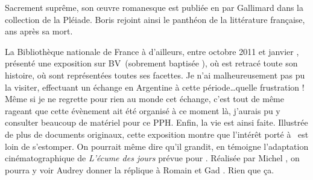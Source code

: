 Sacrement suprême, son \oe{}uvre romanesque est publiée en  par Gallimard dans la collection
de la Pléiade. Boris rejoint ainsi le panthéon de la littérature française,  ans après sa mort.

La Bibliothèque nationale de France à d'ailleurs, entre octobre 2011 et janvier , présenté
une exposition sur BV\ (sobrement baptisée \emph{\BV}), où est retracé toute son histoire, où sont
représentées toutes ses facettes. Je n'ai malheureusement pas pu la visiter, effectuant un échange en Argentine à cette période\ldots quelle frustration ! Même si je ne regrette pour rien au monde cet échange, c'est tout de même rageant que cette évènement ait été organisé à ce moment là, j'aurais pu y consulter beaucoup de matériel pour ce PPH. Enfin, la vie est ainsi faite. Illustrée de plus de  documents originaux, cette
exposition montre que l'intérêt porté à \BV\ est loin de s'estomper. On pourrait même dire qu'il
grandit, en témoigne l'adaptation cinématographique de \emph{L'écume des jours} prévue pour .
Réalisée par Michel , on pourra y voir Audrey  donner la réplique à
Romain  et Gad . Rien que ça.




